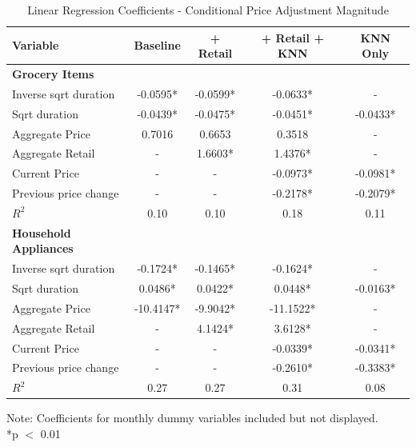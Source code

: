 \documentclass[11pt]{article}
\begin{document}
\begin{table}
    \centering
        \caption{Linear Regression Coefficients - Conditional Price Adjustment Magnitude}
        \vspace{.5cm}
       
    \begin{tabular}{l | c  c  c c } 
 \hline
  \textbf{Variable} & \textbf{Baseline} & \textbf{+ Retail} & \textbf{+ Retail + KNN} & \textbf{KNN Only} \\ [0.5ex] 
 \hline\hline
 \textbf{Grocery Items} & & & &\\
 Inverse sqrt duration & -0.0595* & -0.0599* & -0.0633*  & - \\
  Sqrt duration & -0.0439* & -0.0475* & -0.0451* & -0.0433*  \\
  Aggregate Price & 0.7016 & 0.6653 & 0.3518 & - \\
  Aggregate Retail & - & 1.6603* & 1.4376* & - \\
  Current Price & - & - & -0.0973* & -0.0981* \\
  Previous price change & - & - &  -0.2178* & -0.2079*  \\
 \textit{$R^2$} & 0.10 & 0.10 &  0.18 & 0.11 \\
  \hline
   \textbf{Household Appliances} & & & & \\
 Inverse sqrt duration &  -0.1724* & -0.1465* & -0.1624* & - \\
  Sqrt duration & 0.0486* & 0.0422* & 0.0448*  & -0.0163* \\
  Aggregate Price & -10.4147* & -9.9042* & -11.1522* & - \\
  Aggregate Retail & - & 4.1424* & 3.6128* & - \\
  Current Price & - & - & -0.0339* & -0.0341* \\
  Previous price change & - & - &  -0.2610* &  -0.3383* \\
  \textit{$R^2$} & 0.27 & 0.27 &  0.31 & 0.08   \\
 \hline
\end{tabular}
\begin{tablenotes}
\item Note: Coefficients for monthly dummy variables included but not displayed. \\ *p $<$ 0.01
\end{tablenotes}
\end{table}

\clearpage
\end{document}

